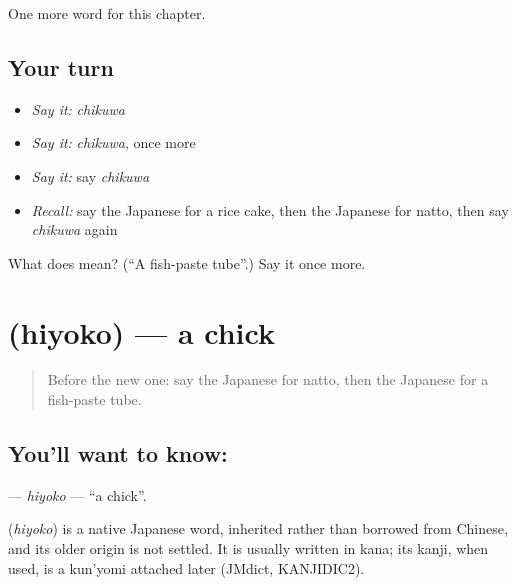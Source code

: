 \begin{grammarlens}[title={What you've built}]
One more word for this chapter.
\end{grammarlens}

\subsection*{Your turn}
\begin{itemize}
\raggedright
  \item \emph{Say it:} \emph{chikuwa}
  \item \emph{Say it:} \emph{chikuwa}, once more
  \item \emph{Say it:} say \emph{chikuwa}
  \item \emph{Recall:} say the Japanese for a rice cake, then the Japanese for natto, then say \emph{chikuwa} again
\end{itemize}

\begin{tcolorbox}[breakable,colback=teal!4,colframe=teal!35!black,title={Before you move on}]
What does  mean? (\textquotedblleft{}A fish-paste tube\textquotedblright{}.) Say it once more.
\end{tcolorbox}
\section[\texorpdfstring{\ja{ひよこ} (hiyoko)}{ひよこ (hiyoko)}]{ (hiyoko) — a chick}

\label{lesson:JA-C70-hiyoko}



\begin{quote}
Before the new one: say the Japanese for natto, then the Japanese for a fish-paste tube.
\end{quote}

\subsection*{You'll want to know: }
\textbf{} — \emph{hiyoko} — \textquotedblleft{}a chick\textquotedblright{}.

\begin{cousinweb}
\textbf{} (\emph{hiyoko}) is a native Japanese word, inherited rather than borrowed from Chinese, and its older origin is not settled. It is usually written in kana; its kanji, when used, is a kun'yomi attached later (JMdict, KANJIDIC2).
\end{cousinweb}


